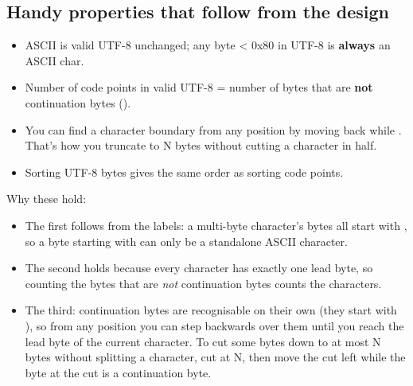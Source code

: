 \documentclass[10pt,a4paper]{article}
\begin{document}
\subsection{Handy properties that follow from the design}
\begin{itemize}
\item ASCII is valid UTF-8 unchanged; any byte \textless{} 0x80 in UTF-8 is \textbf{always} an ASCII char.
\item Number of code points in valid UTF-8 = number of bytes that are \textbf{not} continuation bytes ().
\item You can find a character boundary from any position by moving back while . That’s how you truncate to N bytes without cutting a character in half.
\item Sorting UTF-8 bytes gives the same order as sorting code points.
\end{itemize}
Why these hold:
\begin{itemize}
\item The first follows from the labels: a multi-byte character’s bytes all start with , so a byte starting with  can only be a standalone ASCII character.
\item The second holds because every character has exactly one lead byte, so counting the bytes that are \emph{not} continuation bytes counts the characters.
\item The third: continuation bytes are recognisable on their own (they start with ), so from any position you can step backwards over them until you reach the lead byte of the current character. To cut some bytes down to at most N bytes without splitting a character, cut at N, then move the cut left while the byte at the cut is a continuation byte.
\end{itemize}
\setcounter{section}{4}
\end{document}
